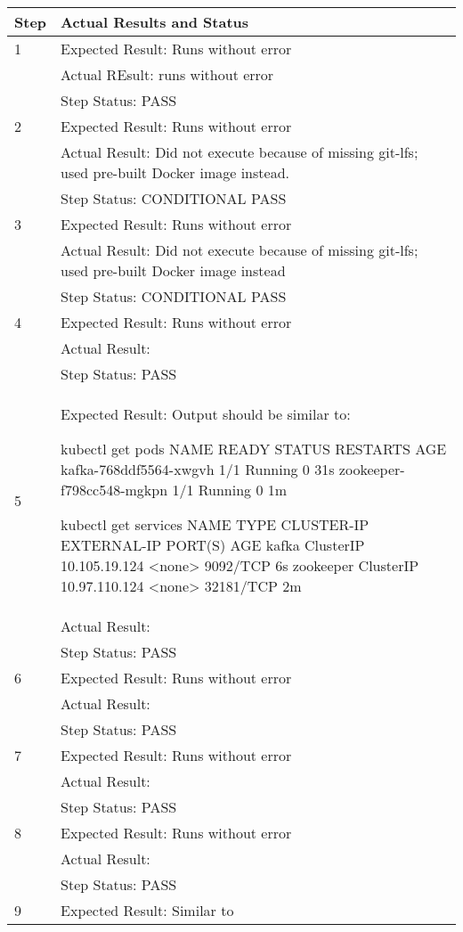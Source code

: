 \documentclass[DM,lsstdraft,STR,toc]{lsstdoc}
\begin{document}
\begin{longtable}{p{2cm}p{14cm}}
\hline
{Step} & {Actual Results and Status}\\ \hline
1 & Expected Result: Runs without error \\\cline{2-2}
  & Actual REsult: runs without error \\\cline{2-2}
  & Step Status: PASS \\\hline
2 & Expected Result: Runs without error \\\cline{2-2}
  & Actual Result: Did not execute because of missing git-lfs; used pre-built Docker image instead. \\\cline{2-2}
  & Step Status: CONDITIONAL PASS \\\hline
3 & Expected Result: Runs without error \\\cline{2-2}
  & Actual Result: Did not execute because of missing git-lfs; used pre-built Docker image instead \\\cline{2-2}
  & Step Status: CONDITIONAL PASS \\\hline
4 & Expected Result: Runs without error \\\cline{2-2}
  & Actual Result: \\\cline{2-2}
  & Step Status: PASS \\\hline
5 & Expected Result: Output should be similar to:

kubectl get pods
NAME                        READY     STATUS    RESTARTS   AGE
kafka-768ddf5564-xwgvh      1/1       Running   0          31s
zookeeper-f798cc548-mgkpn   1/1       Running   0          1m

kubectl get services
NAME        TYPE        CLUSTER-IP      EXTERNAL-IP   PORT(S)     AGE
kafka       ClusterIP   10.105.19.124   <none>        9092/TCP    6s
zookeeper   ClusterIP   10.97.110.124   <none>        32181/TCP   2m
\\\cline{2-2}
  & Actual Result: \\\cline{2-2}
  & Step Status: PASS \\\hline
6 & Expected Result: Runs without error \\\cline{2-2}
  & Actual Result: \\\cline{2-2}
  & Step Status: PASS \\\hline
7 & Expected Result: Runs without error \\\cline{2-2}
  & Actual Result: \\\cline{2-2}
  & Step Status: PASS \\\hline
8 & Expected Result: Runs without error \\\cline{2-2}
  & Actual Result: \\\cline{2-2}
  & Step Status: PASS \\\hline
9 & Expected Result: Similar to


\end{longtable}
\end{document}
